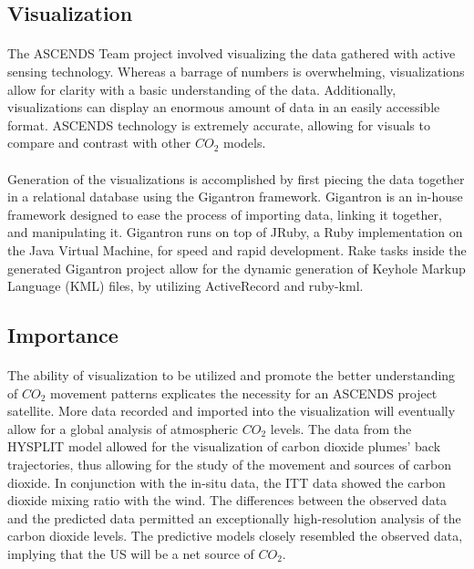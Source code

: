 \documentclass[12pt,letterpaper]{report}
\begin{document}
  \subsection*{Visualization}
   \paragraph{}
    The ASCENDS Team project involved visualizing the data gathered with active sensing technology. Whereas a barrage of numbers is overwhelming, visualizations allow for clarity with a basic understanding of the data. Additionally, visualizations can display an enormous amount of data in an easily accessible format. ASCENDS technology is extremely accurate, allowing for visuals to compare and contrast with other $CO_2$ models.
   \paragraph{}
    Generation of the visualizations is accomplished by first piecing the data together in a relational database using the Gigantron framework. Gigantron is an in-house framework designed to ease the process of importing data, linking it together, and manipulating it. Gigantron runs on top of JRuby, a Ruby implementation on the Java Virtual Machine, for speed and rapid development. Rake tasks inside the generated Gigantron project allow for the dynamic generation of Keyhole Markup Language (KML) files, by utilizing ActiveRecord and ruby-kml.
  \subsection*{Importance}
   \paragraph{}
    The ability of visualization to be utilized and promote the better understanding of $CO_2$ movement patterns explicates the necessity for an ASCENDS project satellite. More data recorded and imported into the visualization will eventually allow for a global analysis of atmospheric $CO_2$ levels. The data from the HYSPLIT model allowed for the visualization of carbon dioxide plumes' back trajectories, thus allowing for the study of the movement and sources of carbon dioxide. In conjunction with the in-situ data, the ITT data showed the carbon dioxide mixing ratio with the wind. The differences between the observed data and the predicted data permitted an exceptionally high-resolution analysis of the carbon dioxide levels. The predictive models closely resembled the observed data, implying that the US will be a net source of $CO_2$.
\end{document}
